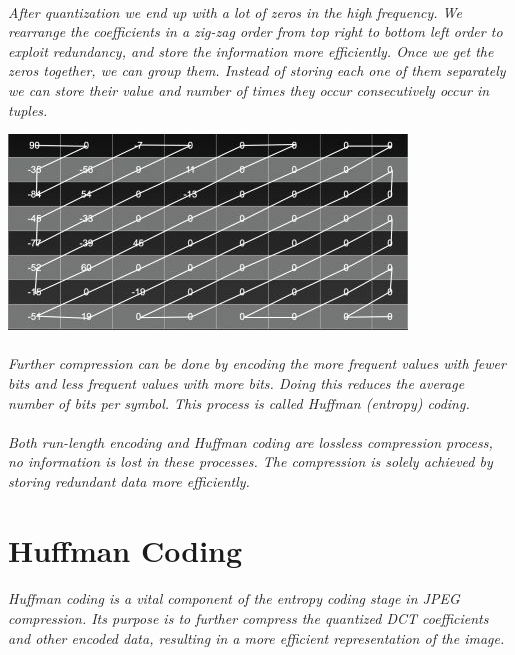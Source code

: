 \documentclass[12pt, letterpaper]{article}
\begin{document}
\paragraph{}\textit{After quantization we end up with a lot of zeros in the high frequency. We rearrange the coefficients in a zig-zag order from top right to bottom left order to exploit redundancy, and store the information more efficiently. Once we get the zeros together, we can group them. Instead of storing each one of them separately we can store their value and number of times they occur consecutively occur in tuples.}
\begin{center}
    \includegraphics{Run1} 
\end{center}
\paragraph{}\textit{Further compression can be done by encoding the more frequent values with fewer bits and less frequent values with more bits. Doing this reduces the average number of bits per symbol. This process is called Huffman (entropy) coding.}
\paragraph{}\textit{Both run-length encoding and Huffman coding are lossless compression process, no information is lost in these processes. The compression is solely achieved by storing redundant data more efficiently. }
\section{{\color{blue}Huffman Coding}}
\paragraph{}\textit{Huffman coding is a vital component of the entropy coding stage in JPEG compression. Its purpose is to further compress the quantized DCT coefficients and other encoded data, resulting in a more efficient representation of the image.  }
\end{document}
